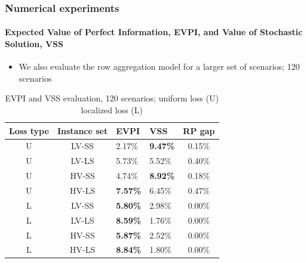 \documentclass[9pt,xcolor={dvipsnames}]{beamer}
\begin{document}
\begin{frame}%
	\frametitle{Numerical experiments}
	\framesubtitle{Expected Value of Perfect Information, EVPI, and Value of Stochastic Solution, VSS}	
	\begin{itemize}
		\item<1-> We also evaluate the row aggregation model for a larger set of scenarios; 120 scenarios
	\end{itemize}
	\bigskip
	{
	\begin{table}[h!]
		\centering
		\footnotesize
		\begin{tabular}{c c j f c}
			\hline
			Loss type & Instance set & EVPI & VSS & RP gap \\
			\hline
			U & LV-SS & 2.17\% & \textbf{9.47\%} & 0.15\% \\
			U & LV-LS & 5.73\% & 5.52\% & 0.40\% \\
   
			U & HV-SS & 4.74\% & \textbf{8.92\%} & 0.18\% \\
			U & HV-LS & \textbf{7.57\%} & 6.45\% & 0.47\% \\
			\hline
			L & LV-SS & \textbf{5.80\%} & 2.98\% & 0.00\% \\
			L & LV-LS & \textbf{8.59\%} & 1.76\% & 0.00\% \\
   
			L & HV-SS & \textbf{5.87\%} & 2.52\% & 0.00\% \\
			L & HV-LS & \textbf{8.84\%} & 1.80\% & 0.00\% \\
			\hline
		\end{tabular}
		\caption{EVPI and VSS evaluation, 120 scenarios; uniform loss (U) localized loss (L)}
		\label{tab:optres3}
	\end{table}
	}
\end{frame}
\end{document}
